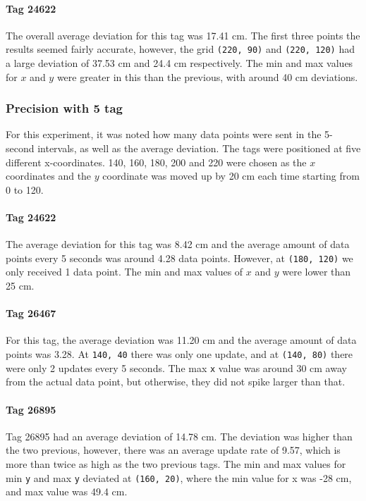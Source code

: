 \paragraph{Tag 24622}
The overall average deviation for this tag was 17.41 cm.
The first three points the results seemed fairly accurate, however, the grid \texttt{(220, 90)} and \texttt{(220, 120)} had a large deviation of 37.53 cm and 24.4 cm respectively.
The min and max values for $x$ and $y$ were greater in this than the previous, with around 40 cm deviations.

\subsubsection{Precision with 5 tag}
For this experiment, it was noted how many data points were sent in the 5-second intervals, as well as the average deviation.
The tags were positioned at five different x-coordinates. 
140, 160, 180, 200 and 220 were chosen as the $x$ coordinates and the $y$ coordinate was moved up by 20 cm each time starting from 0 to 120.

\paragraph{Tag 24622}
The average deviation for this tag was 8.42 cm and the average amount of data points every 5 seconds was around 4.28 data points.
However, at \texttt{(180, 120)} we only received 1 data point.
The min and max values of $x$ and $y$ were lower than 25 cm.

\paragraph{Tag 26467}
For this tag, the average deviation was 11.20 cm and the average amount of data points was 3.28.
At \texttt{140, 40} there was only one update, and at \texttt{(140, 80)} there were only 2 updates every 5 seconds.
The max \texttt{x} value was around 30 cm away from the actual data point, but otherwise, they did not spike larger than that.

\paragraph{Tag 26895}
Tag 26895 had an average deviation of 14.78 cm. 
The deviation was higher than the two previous, however, there was an average update rate of 9.57, which is more than twice as high as the two previous tags.
The min and max values for min \texttt{y} and max \texttt{y} deviated at \texttt{(160, 20)}, where the min value for x was -28 cm, and max value was 49.4 cm.

